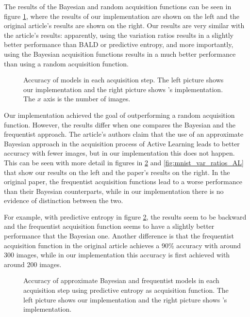 The results of the Bayesian and random acquisition functions can be seen in figure \ref{fig:mnist_comparison_active_learning_random}, where the results of our implementation are shown on the left and the original article's results are shown on the right. Our results are very similar with the article's results: apparently, using the variation ratios results in a slightly better performance than BALD or predictive entropy, and more importantly, using the Bayesian acquisition functions results in a much better performance than using a random acquisition function.

\begin{figure}[H]
    \centering
    \hfill
    \caption{Accuracy of models in each acquisition step. The left picture shows our implementation and the right picture shows \citeauthor{Gal2016Active}'s implementation. The $x$ axis is the number of images.}
    \label{fig:mnist_comparison_active_learning_random}
\end{figure}

Our implementation achieved the goal of outperforming a random acquisition function. However, the results differ when one compares the Bayesian and the frequentist approach. The article's authors claim that the use of an approximate Bayesian approach in the acquisition process of Active Learning leads to better accuracy with fewer images, but in our implementation this does not happen. This can be seen with more detail in figures in \ref{fig:mnist_pred_entropy_AL} and \ref{fig:mnist_var_ratios_AL} that show our results on the left and the paper's results on the right. In the original paper, the frequentist acquisition functions lead to a worse performance than their Bayesian counterparts, while in our implementation there is no evidence of distinction between the two.

For example, with predictive entropy in figure \ref{fig:mnist_pred_entropy_AL}, the results seem to be backward and the frequentist acquisition function seems to have a slightly better performance that the Bayesian one. Another difference is that the frequentist acquisition function in the original article achieves a 90\% accuracy with around 300 images, while in our implementation this accuracy is first achieved with around 200 images.

\begin{figure}[H]
  \centering
  \hfill
  \caption{Accuracy of approximate Bayesian and frequentist models in each acquisition step using predictive entropy as acquisition function. The left picture shows our implementation and the right picture shows \citeauthor{Gal2016Active}'s implementation.}
  \label{fig:mnist_pred_entropy_AL}
\end{figure}

